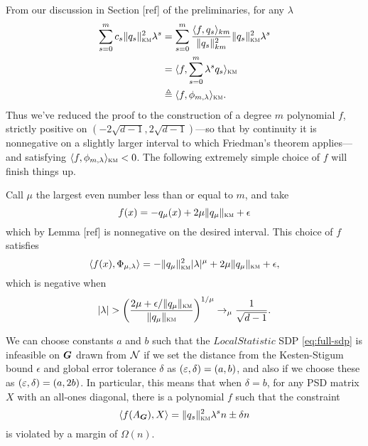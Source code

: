 From our discussion in Section [ref] of the preliminaries, for any $\lambda$
\begin{align*}
    \sum_{s=0}^m c_s \|q_s\|^2_{\textsc{km}}\lambda^s 
    &= \sum_{s=0}^m \frac{\langle f,q_s \rangle_{km}}{\|q_s\|^2_{km}}\|q_s\|^2_{\textsc{km}}\lambda^s \\
    &= \langle f, \sum_{s=0}^m \lambda^s q_s \rangle_{\textsc{km}} \\
    &\triangleq \langle f, \phi_{m,\lambda} \rangle_{\textsc{km}}.
\end{align*}
Thus we've reduced the proof to the construction of a degree $m$ polynomial $f$, strictly positive on $(-2\sqrt{d-1},2\sqrt{d-1})$---so that by continuity it is nonnegative on a slightly larger interval to which Friedman's theorem applies---and satisfying $\langle f, \phi_{m,\lambda}\rangle_{\textsc{km}} < 0$. The following extremely simple choice of $f$ will finish things up.

Call $\mu$ the largest even number less than or equal to $m$, and take 
$$
    f(x) = -q_\mu(x) + 2\mu\|q_\mu\|_{\textsc{km}} + \epsilon
$$
which by Lemma [ref] is nonnegative on the desired interval. This choice of $f$ satisfies
$$
    \langle f(x),\Phi_{\mu,\lambda}\rangle = -\|q_\mu\|^2_{\textsc{km}}|\lambda|^\mu + 2\mu\|q_\mu\|_{\textsc{km}} + \epsilon,
$$
which is negative when
$$
    |\lambda| > \left(\frac{2\mu + \epsilon/\|q_\mu\|_{\textsc{km}}}{\|q_\mu\|_{\textsc{km}}}\right)^{1/\mu} \to_\mu \frac{1}{\sqrt{d-1}}.
$$

\begin{remark}  \label{rem:violation-margin}
    We can choose constants $a$ and $b$ such that the $LocalStatistic$ SDP \eqref{eq:full-sdp} is infeasible on $\boldsymbol{G}$ drawn from $\mathcal{N}$ if we set the distance from the Kesten-Stigum bound $\epsilon$ and global error tolerance $\delta$ as $(\varepsilon, \delta) = (a, b)$, and also if we choose these as $(\varepsilon, \delta) = (a, 2b)$. In particular, this means that when $\delta = b$, for any PSD matrix $X$ with an all-ones diagonal, there is a polynomial $f$ such that the constraint
    \[
        \langle f(A_{\boldsymbol{G}}), X\rangle = \|q_s\|^2_{\textsc{km}}\lambda^s n \pm \delta n
    \]
    is violated by a margin of $\Omega(n)$.
\end{remark}


